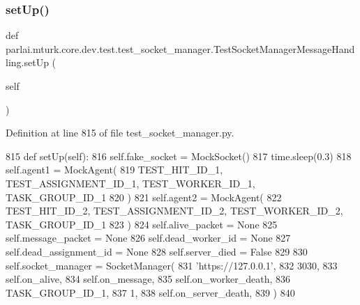 \subsubsection{\texorpdfstring{set\+Up()}{setUp()}}
{\footnotesize\ttfamily def parlai.\+mturk.\+core.\+dev.\+test.\+test\+\_\+socket\+\_\+manager.\+Test\+Socket\+Manager\+Message\+Handling.\+set\+Up (\begin{DoxyParamCaption}\item[{}]{self }\end{DoxyParamCaption})}



Definition at line 815 of file test\+\_\+socket\+\_\+manager.\+py.


\begin{DoxyCode}
815     \textcolor{keyword}{def }setUp(self):
816         self.fake\_socket = MockSocket()
817         time.sleep(0.3)
818         self.agent1 = MockAgent(
819             TEST\_HIT\_ID\_1, TEST\_ASSIGNMENT\_ID\_1, TEST\_WORKER\_ID\_1, TASK\_GROUP\_ID\_1
820         )
821         self.agent2 = MockAgent(
822             TEST\_HIT\_ID\_2, TEST\_ASSIGNMENT\_ID\_2, TEST\_WORKER\_ID\_2, TASK\_GROUP\_ID\_1
823         )
824         self.alive\_packet = \textcolor{keywordtype}{None}
825         self.message\_packet = \textcolor{keywordtype}{None}
826         self.dead\_worker\_id = \textcolor{keywordtype}{None}
827         self.dead\_assignment\_id = \textcolor{keywordtype}{None}
828         self.server\_died = \textcolor{keyword}{False}
829 
830         self.socket\_manager = SocketManager(
831             \textcolor{stringliteral}{'https://127.0.0.1'},
832             3030,
833             self.on\_alive,
834             self.on\_message,
835             self.on\_worker\_death,
836             TASK\_GROUP\_ID\_1,
837             1,
838             self.on\_server\_death,
839         )
840 
\end{DoxyCode}
\mbox{\label{classparlai_1_1mturk_1_1core_1_1dev_1_1test_1_1test__socket__manager_1_1TestSocketManagerMessageHandling_a6ac379f0b0dc0303890f13ffb0dd4364}} 
